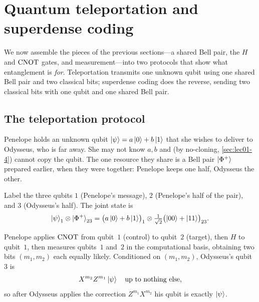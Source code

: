 \section{Quantum teleportation and superdense coding}
\label{sec:lec01-tele}

We now assemble the pieces of the previous sections---a shared Bell pair, the
$H$ and $\mathrm{CNOT}$ gates, and measurement---into two protocols that show what
entanglement is \emph{for}. Teleportation transmits one unknown qubit using one
shared Bell pair and two classical bits; superdense coding does the reverse, sending
two classical bits with one qubit and one shared Bell pair.

\subsection{The teleportation protocol}

Penelope holds an unknown qubit $\ket{\psi}=a\ket{0}+b\ket{1}$ that she wishes to
deliver to Odysseus, who is far away. She may not know $a,b$ and (by no-cloning,
\cref{sec:lec01-4}) cannot copy the qubit. The one resource they share is a Bell pair
$\ket{\Phi^{+}}$ prepared earlier, when they were together: Penelope keeps one half,
Odysseus the other.

Label the three qubits $1$ (Penelope's message), $2$ (Penelope's half of the pair), and $3$
(Odysseus's half). The joint state is
\begin{equation}\label{eq:lec01-tele-init}
  \ket{\psi}_1\otimes\ket{\Phi^{+}}_{23}
    =\bigl(a\ket{0}+b\ket{1}\bigr)_1\otimes\tfrac{1}{\sqrt2}\bigl(\ket{00}+\ket{11}\bigr)_{23}.
\end{equation}

\begin{theorem}[Teleportation]\label{thm:lec01-tele}
Penelope applies $\mathrm{CNOT}$ from qubit~$1$ (control) to qubit~$2$ (target), then $H$ to
qubit~$1$, then measures qubits~$1$ and~$2$ in the computational basis, obtaining two
bits $(m_1,m_2)$ each equally likely. Conditioned on $(m_1,m_2)$, Odysseus's qubit~$3$ is
\[
  X^{m_2}Z^{m_1}\ket{\psi}\quad\text{up to nothing else,}
\]
so after Odysseus applies the correction $Z^{m_1}X^{m_2}$ his qubit is exactly $\ket{\psi}$.
\end{theorem}

